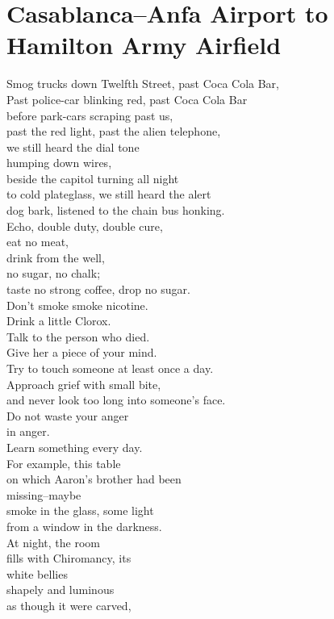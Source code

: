 \documentclass[smalldemyvopaper,11pt,twoside,onecolumn,openright,extrafontsizes]{memoir}
\newlength\drop
\begin{document}
\chapter{Casablanca–Anfa Airport to Hamilton Army Airfield}
Smog trucks down Twelfth Street, past Coca Cola Bar,
\\Past police-car blinking red, past Coca Cola Bar
\\before park-cars scraping past us,
\\past the red light, past the alien telephone,
\\we still heard the dial tone
\\humping down wires,
\\beside the capitol turning all night
\\to cold plateglass, we still heard the alert
\\dog bark, listened to the chain bus honking.
\\Echo, double duty, double cure,
\\eat no meat,
\\drink from the well,
\\no sugar, no chalk;
\\taste no strong coffee, drop no sugar.
\\Don't smoke smoke nicotine.
\\Drink a little Clorox.
\\Talk to the person who died.
\\Give her a piece of your mind.
\\Try to touch someone at least once a day.
\\Approach grief with small bite,
\\and never look too long into someone's face.
\\Do not waste your anger
\\in anger.
\\Learn something every day.
\\For example, this table
\\on which Aaron's brother had been
\\missing--maybe
\\smoke in the glass, some light
\\from a window in the darkness.
\\At night, the room
\\fills with Chiromancy, its
\\white bellies
\\shapely and luminous
\\as though it were carved,
\end{document}
